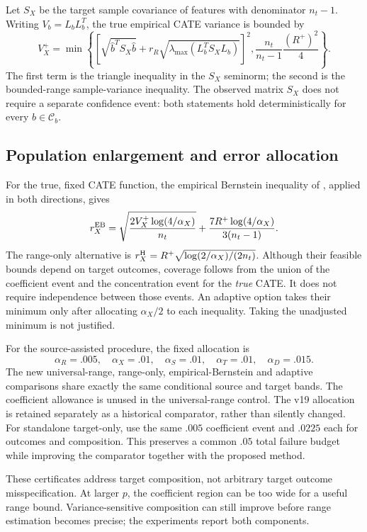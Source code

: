 Let $S_X$ be the target sample covariance of features with denominator $n_t-1$.
Writing $V_b=L_bL_b^T$, the true empirical CATE variance is bounded by
\[
 V_X^+=\min\left\{
  \left[\sqrt{\widehat b^TS_X\widehat b}
       +r_R\sqrt{\lambda_{\max}(L_b^TS_XL_b)}\right]^2,
  \frac{n_t}{n_t-1}\frac{(R^+)^2}{4}\right\}.
\]
The first term is the triangle inequality in the $S_X$ seminorm; the second is
the bounded-range sample-variance inequality. The observed matrix $S_X$ does
not require a separate confidence event: both statements hold deterministically
for every $b\in\mathcal C_b$.

\subsection{Population enlargement and error allocation}

For the true, fixed CATE function, the empirical Bernstein inequality of
\citet[Theorem 4]{maurer2009}, applied in both directions, gives
\[
 r_X^{\rm EB}=\sqrt{\frac{2V_X^+\log(4/\alpha_X)}{n_t}}
        +\frac{7R^+\log(4/\alpha_X)}{3(n_t-1)}.
\]
The range-only alternative is
$r_X^{\rm H}=R^+\sqrt{\log(2/\alpha_X)/(2n_t)}$.
Although their feasible bounds depend on target outcomes, coverage follows
from the union of the coefficient event and the concentration event for the
\emph{true} CATE. It does not require independence between those events.
An adaptive option takes their minimum only after allocating $\alpha_X/2$ to
each inequality. Taking the unadjusted minimum is not justified.

For the source-assisted procedure, the fixed allocation is
\[
 \alpha_R=.005,\quad\alpha_X=.01,\quad
 \alpha_S=.01,\quad\alpha_T=.01,\quad\alpha_D=.015.
\]
The new universal-range, range-only, empirical-Bernstein and adaptive comparisons
share exactly the same conditional source and target bands. The coefficient
allowance is unused in the universal-range control. The v19 allocation is
retained separately as a historical comparator, rather than silently changed.
For standalone target-only, use the same $.005$ coefficient event and $.0225$
each for outcomes and composition. This preserves a common $.05$ total failure
budget while improving the comparator together with the proposed method.

These certificates address target composition, not arbitrary target outcome
misspecification. At larger $p$, the coefficient region can be too wide for a
useful range bound. Variance-sensitive composition can still improve before
range estimation becomes precise; the experiments report both components.

